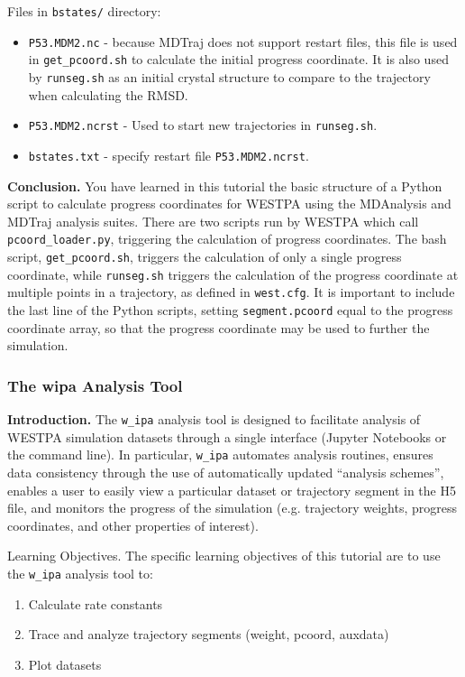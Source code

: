 Files in \verb|bstates/| directory:
\begin{itemize}
\item \verb|P53.MDM2.nc| - because MDTraj does not support restart files, this file is used in \verb|get_pcoord.sh| to calculate the initial progress coordinate. 
It is also used by \verb|runseg.sh| as an initial crystal structure to compare to the trajectory when calculating the RMSD.
\item \verb|P53.MDM2.ncrst| - Used to start new trajectories in \verb|runseg.sh|.
\item \verb|bstates.txt| - specify restart file \verb|P53.MDM2.ncrst|.
\end{itemize}

\textbf{Conclusion.} You have learned in this tutorial the basic structure of a Python script to calculate progress coordinates for WESTPA using the MDAnalysis and MDTraj analysis suites. 
There are two scripts run by WESTPA which call \verb|pcoord_loader.py|, triggering the calculation of progress coordinates. 
The bash script, \verb|get_pcoord.sh|, triggers the calculation of only a single progress coordinate, while \verb|runseg.sh| triggers the calculation of the progress coordinate at multiple points in a trajectory, as defined in \verb|west.cfg|. 
It is important to include the last line of the Python scripts, setting \verb|segment.pcoord| equal to the progress coordinate array, so that the progress coordinate may be used to further the simulation.

\subsubsection{The w\textunderscore ipa Analysis Tool}
\label{tut:analysis_adv_w_ipa}

\textbf{Introduction.} The \verb|w_ipa| analysis tool is designed to facilitate analysis of WESTPA simulation datasets through a single interface (Jupyter Notebooks or the command line). 
In particular, \verb|w_ipa| automates analysis routines, ensures data consistency through the use of automatically updated “analysis schemes”, enables a user to easily view a particular dataset or trajectory segment in the H5 file, and monitors the progress of the simulation (e.g. trajectory weights, progress coordinates, and other properties of interest).  

Learning Objectives. The specific learning objectives of this tutorial are to use the \verb|w_ipa| analysis tool to:
\begin{enumerate} 
\item Calculate rate constants
\item Trace and analyze trajectory segments (weight, pcoord, auxdata)
\item Plot datasets
\end{enumerate}

